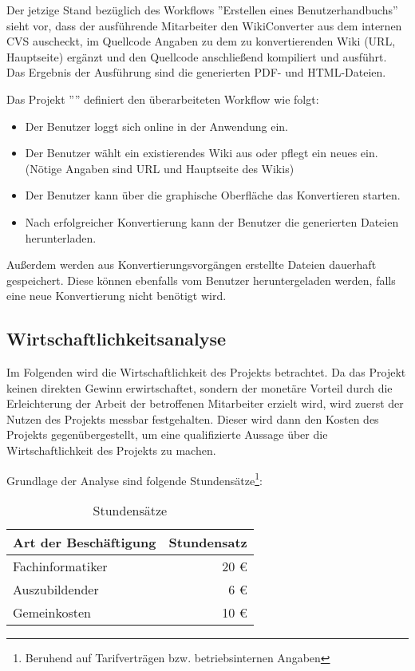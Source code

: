 \documentclass[12pt, xcolor=dvipsnames]{scrartcl}
\begin{document}
Der jetzige Stand bezüglich des Workflows ''Erstellen eines Benutzerhandbuchs'' sieht vor, dass der ausführende Mitarbeiter den WikiConverter aus dem internen CVS auscheckt, im Quellcode Angaben zu dem zu konvertierenden Wiki (URL, Hauptseite) ergänzt und den Quellcode anschließend kompiliert und ausführt. Das Ergebnis der Ausführung sind die generierten PDF- und HTML-Dateien.

Das Projekt ''\Projekt'' definiert den überarbeiteten Workflow wie folgt:

\begin{itemize}
	\item Der Benutzer loggt sich online in der Anwendung ein.
	\item Der Benutzer wählt ein existierendes Wiki aus oder pflegt ein neues ein. (Nötige Angaben sind URL und Hauptseite des Wikis)
	\item Der Benutzer kann über die graphische Oberfläche das Konvertieren starten.
	\item Nach erfolgreicher Konvertierung kann der Benutzer die generierten Dateien herunterladen.
\end{itemize}

Außerdem werden aus Konvertierungsvorgängen erstellte Dateien dauerhaft gespeichert. Diese können ebenfalls vom Benutzer heruntergeladen werden, falls eine neue Konvertierung nicht benötigt wird.

\subsection{Wirtschaftlichkeitsanalyse}
\label{sec:wirtschaftlichkeitsanalyse}

Im Folgenden wird die Wirtschaftlichkeit des Projekts betrachtet. Da das Projekt keinen direkten Gewinn erwirtschaftet, sondern der monetäre Vorteil durch die Erleichterung der Arbeit der betroffenen Mitarbeiter erzielt wird, wird zuerst der Nutzen des Projekts messbar festgehalten. Dieser wird dann den Kosten des Projekts gegenübergestellt, um eine qualifizierte Aussage über die Wirtschaftlichkeit des Projekts zu machen.

Grundlage der Analyse sind folgende Stundensätze\footnote{Beruhend auf Tarifverträgen bzw. betriebsinternen Angaben}:

\begin{table}[H]
	\centering
	\begin{tabular}{lr}

		\rowcolor{white!15}				
		\textbf{Art der Beschäftigung} & \textbf{Stundensatz} \\\hline		
		
		Fachinformatiker & 20 \euro \\
		Auszubildender & 6 \euro \\
		Gemeinkosten & 10 \euro \\
			    
	\end{tabular}
	\caption{Stundensätze}
	\label{tab:stundensätze}
\end{table}
\end{document}
